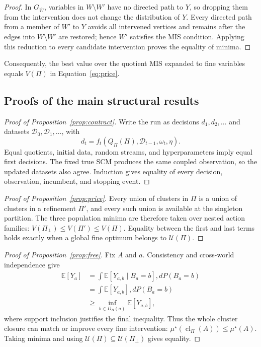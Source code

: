 \documentclass[twoside]{article}
\newcommand{\E}{\mathbb{E}}
\begin{document}
\begin{proof}
In $G_{\bar W}$, variables in $W\setminus W'$ have no directed path to
$Y$, so dropping them from the intervention does not change the distribution
of $Y$. Every directed path from a member of $W'$ to $Y$ avoids all
intervened vertices and remains after the edges into $W\setminus W'$ are
restored; hence $W'$ satisfies the MIS condition. Applying this reduction to
every candidate intervention proves the equality of minima.
\end{proof}

Consequently, the best value over the quotient MIS expanded to fine
variables equals $V(\Pi)$ in Equation~\eqref{eq:price}.

\subsection{Proofs of the main structural results}

\begin{proof}[Proof of Proposition~\ref{prop:contract}]
Write the run as decisions $d_1,d_2,\ldots$ and datasets
$\mathcal D_0,\mathcal D_1,\ldots$, with
\[
d_t=f_t\!\left(Q_\Pi(H),\mathcal D_{t-1},\omega_t,\eta\right).
\]
Equal quotients, initial data, random streams, and hyperparameters imply
equal first decisions. The fixed true SCM produces the same coupled
observation, so the updated datasets also agree. Induction gives equality of
every decision, observation, incumbent, and stopping event.
\end{proof}

\begin{proof}[Proof of Proposition~\ref{prop:price}]
Every union of clusters in $\Pi$ is a union of clusters in a refinement
$\Pi'$, and every such union is available at the singleton partition. The
three population minima are therefore taken over nested action families:
$V(\Pi_\bot)\le V(\Pi')\le V(\Pi)$. Equality between the first and last
terms holds exactly when a global fine optimum belongs to
$\mathcal U(\Pi)$.
\end{proof}

\begin{proof}[Proof of Proposition~\ref{prop:free}]
Fix $A$ and $a$. Consistency and cross-world independence give
\[
\begin{aligned}
 \E[Y_a]
 &=\int \E[Y_{a,b}\mid B_a=b],dP(B_a=b)\\
 &=\int \E[Y_{a,b}],dP(B_a=b)\\
 &\ge \inf_{b\in D_B(a)}\E[Y_{a,b}],
\end{aligned}
\]
where support inclusion justifies the final inequality. Thus the whole
cluster closure can match or improve every fine intervention:
$\mu^\star(\operatorname{cl}_\Pi(A))\le\mu^\star(A)$. Taking minima and
using $\mathcal U(\Pi)\subseteq\mathcal U(\Pi_\bot)$ gives equality.
\end{proof}
\end{document}
